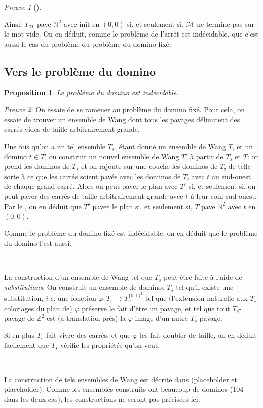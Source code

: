 \documentclass{scrartcl}
\newcommand{\N}{\mathbb N}
\newcommand{\Z}{\mathbb Z}
\newtheorem{proposition}{Proposition}
\theoremstyle{definition}
\theoremstyle{remark}
\newtheorem{preuve}{Preuve}
\begin{document}
\begin{preuve}[]
  \ 

  Ainsi, $T_\mathcal M$ pave $\N^2$ avec $\mathrm{init}$ en $(0,0)$ si, et seulement si, $\mathcal M$ ne termine pas sur le mot vide. On en déduit, comme le problème de l'arrêt est indécidable, que c'est aussi le cas du problème du problème du domino fixé.
\end{preuve}

\subsection{Vers le problème du domino}

\begin{proposition}
  Le problème du domino est indécidable.
\end{proposition}

\begin{preuve}
  On essaie de se ramener au problème du domino fixé. Pour cela, on essaie de trouver un ensemble de Wang dont tous les pavages délimitent des carrés vides de taille arbitrairement grande.
  
  Une fois qu'on a un tel ensemble $T_s$, étant donné un ensemble de Wang $T$, et un domino $t\in T$, on construit un nouvel ensemble de Wang $T'$ à partir de $T_s$ et $T$: on prend les dominos de $T_s$ et on rajoute sur une couche les dominos de $T$, de telle sorte à ce que les carrés soient pavés avec les dominos de $T$, avec $t$ au sud-ouest de chaque grand carré. Alors on peut paver le plan avec $T'$ si, et seulement si, on peut paver des carrés de taille arbitrairement grande avec $t$ à leur coin sud-ouest. Par le , on en déduit que $T'$ pavee le plan si, et seulement si, $T$ pave $\N^2$ avec $t$ en $(0,0)$.

  Comme le problème du domino fixé est indécidable, on en déduit que le problème du domino l'est aussi.

  \

  La construction d'un ensemble de Wang tel que $T_s$ peut être faite à l'aide de \emph{substitutions}. On construit un ensemble de dominos $T_s$ tel qu'il existe une substitution, \emph{i.e.} une fonction $\varphi:T_s\to T_s^{\{0,1\}^2}$ tel que (l'extension naturelle aux $T_s$-coloriages du plan de) $\varphi$ préserve le fait d'être un pavage, et tel que tout $T_s$-pavage de $\Z^2$ est (à translation près) la $\varphi$-image d'un autre $T_s$-pavage.
  
  Si en plus $T_s$ fait vivre des carrés, et que $\varphi$ les fait doubler de taille, on en déduit facilement que $T_s$ vérifie les propriétés qu'on veut.

  \

  La construction de tels ensembles de Wang est décrite dans (placeholder et placeholder). Comme les ensembles construits ont beaucoup de dominos ($104$ dans les deux cas), les constructions ne seront pas précisées ici.
\end{preuve}
\end{document}
